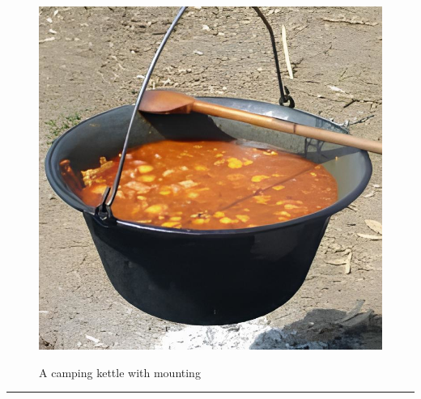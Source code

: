 \documentclass{article}
\begin{document}
    \begin{figure}[H]
        \centering
        \begin{minipage}{0.25\textwidth}
            \centering
            \includegraphics[width=\textwidth]{../SurvivalItemImages/pot}
        \end{minipage}\hfill
        \begin{minipage}{0.7\textwidth}
            \centering
            \Large A camping kettle with mounting
        \end{minipage}
    \end{figure}
    \vspace{-0.8em}
    \noindent\rule{\textwidth}{0.4pt}
            
    \clearpage
\end{document}
